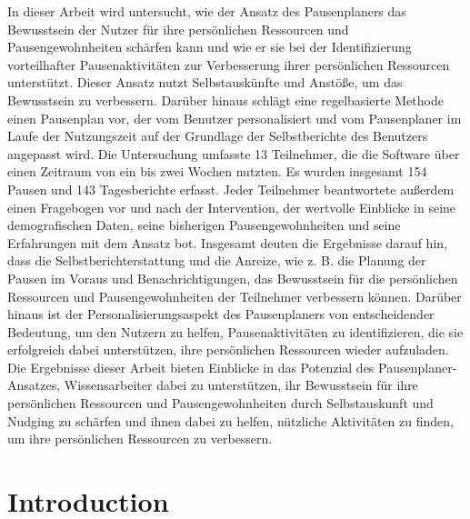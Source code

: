 \documentclass{hasel_thesis}
\begin{document}
\begin{Zusammenfassung}
In dieser Arbeit wird untersucht, wie der Ansatz des Pausenplaners das Bewusstsein der Nutzer für ihre persönlichen Ressourcen und Pausengewohnheiten schärfen kann und wie er sie bei der Identifizierung vorteilhafter Pausenaktivitäten zur Verbesserung ihrer persönlichen Ressourcen unterstützt. Dieser Ansatz nutzt Selbstauskünfte und Anstöße, um das Bewusstsein zu verbessern. Darüber hinaus schlägt eine regelbasierte Methode einen Pausenplan vor, der vom Benutzer personalisiert und vom Pausenplaner im Laufe der Nutzungszeit auf der Grundlage der Selbstberichte des Benutzers angepasst wird. Die Untersuchung umfasste 13 Teilnehmer, die die Software über einen Zeitraum von ein bis zwei Wochen nutzten. Es wurden insgesamt 154 Pausen und 143 Tagesberichte erfasst. Jeder Teilnehmer beantwortete außerdem einen Fragebogen vor und nach der Intervention, der wertvolle Einblicke in seine demografischen Daten, seine bisherigen Pausengewohnheiten und seine Erfahrungen mit dem Ansatz bot. Insgesamt deuten die Ergebnisse darauf hin, dass die Selbstberichterstattung und die Anreize, wie z. B. die Planung der Pausen im Voraus und Benachrichtigungen, das Bewusstsein für die persönlichen Ressourcen und Pausengewohnheiten der Teilnehmer verbessern können. Darüber hinaus ist der Personalisierungsaspekt des Pausenplaners von entscheidender Bedeutung, um den Nutzern zu helfen, Pausenaktivitäten zu identifizieren, die sie erfolgreich dabei unterstützen, ihre persönlichen Ressourcen wieder aufzuladen. Die Ergebnisse dieser Arbeit bieten Einblicke in das Potenzial des Pausenplaner-Ansatzes, Wissensarbeiter dabei zu unterstützen, ihr Bewusstsein für ihre persönlichen Ressourcen und Pausengewohnheiten durch Selbstauskunft und Nudging zu schärfen und ihnen dabei zu helfen, nützliche Aktivitäten zu finden, um ihre persönlichen Ressourcen zu verbessern.
\end{Zusammenfassung}
    

\tableofcontents
\listoffigures
\listoftables

\mainmatter
\chapter{Introduction}
\end{document}
